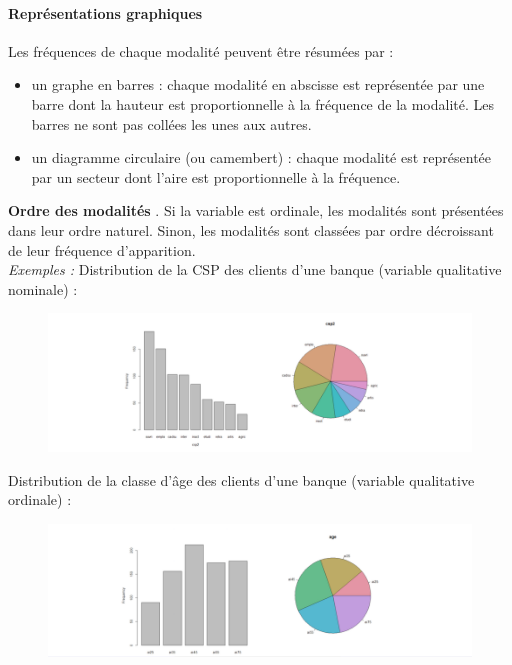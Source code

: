 \paragraph{Représentations graphiques} 
Les fréquences de chaque modalité peuvent être résumées par :
\begin{itemize}
\item un graphe en barres : chaque modalité en abscisse est représentée par une barre dont la hauteur est proportionnelle à la fréquence de la modalité. Les barres ne sont pas collées les unes aux autres.
\item un diagramme circulaire (ou camembert) : chaque modalité est représentée par un secteur dont l'aire est proportionnelle à la fréquence.
\end{itemize}
\textbf{Ordre des modalités} . Si la variable est ordinale, les modalités sont présentées dans leur ordre naturel. Sinon, les modalités sont classées par ordre décroissant de leur fréquence d'apparition.\newline
\\
\textit{Exemples : }
Distribution de la CSP des clients d'une banque (variable qualitative nominale) :
\begin{figure}[H]\begin{center}\includegraphics[scale=0.7]{ilu/ccm3.png}\end{center}\end{figure}
Distribution de la classe d'âge des clients d'une banque (variable qualitative ordinale) :
\begin{figure}[H]\begin{center}\includegraphics[scale=0.7]{ilu/ccm4.png}\end{center}\end{figure}
